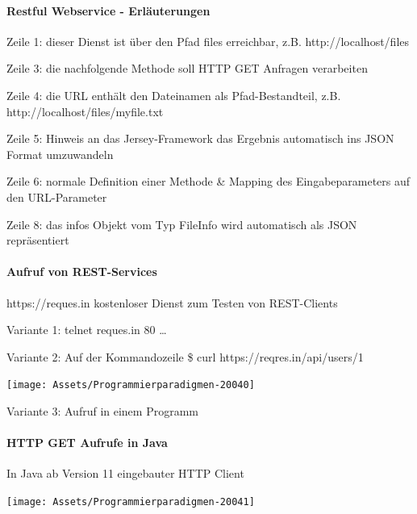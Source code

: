 \documentclass[10pt]{article}
\begin{document}
  \paragraph{Restful Webservice - Erläuterungen}
  
  \begin{itemize*}
    \item Zeile 1: dieser Dienst ist über den Pfad files erreichbar,
    z.B. http://localhost/files
    \item Zeile 3: die nachfolgende Methode soll HTTP GET Anfragen
    verarbeiten
    \item Zeile 4: die URL enthält den Dateinamen als
    Pfad-Bestandteil, z.B.
    http://localhost/files/myfile.txt
    \item Zeile 5: Hinweis an das Jersey-Framework das Ergebnis
    automatisch ins JSON Format umzuwandeln
    \item Zeile 6: normale Definition einer Methode \& Mapping des
    Eingabeparameters auf den URL-Parameter
    \item Zeile 8: das infos Objekt vom Typ FileInfo wird
    automatisch als JSON repräsentiert
  \end{itemize*}
  
  \paragraph{Aufruf von REST-Services}
  
  https://reques.in kostenloser Dienst zum Testen von REST-Clients
  \begin{itemize*}
    \item Variante 1: telnet reques.in 80 …
    \item Variante 2: Auf der Kommandozeile \newline
    \$ curl https://reqres.in/api/users/1
    \begin{center}
      \centering
      \texttt{[image: Assets/Programmierparadigmen-20040]}
    \end{center}
    \item Variante 3: Aufruf in einem Programm
  \end{itemize*}
  
  \paragraph{HTTP GET Aufrufe in Java}
  
  In Java ab Version 11 eingebauter HTTP Client
  \begin{center}
    \centering
    \texttt{[image: Assets/Programmierparadigmen-20041]}
  \end{center}
  
\end{document}
